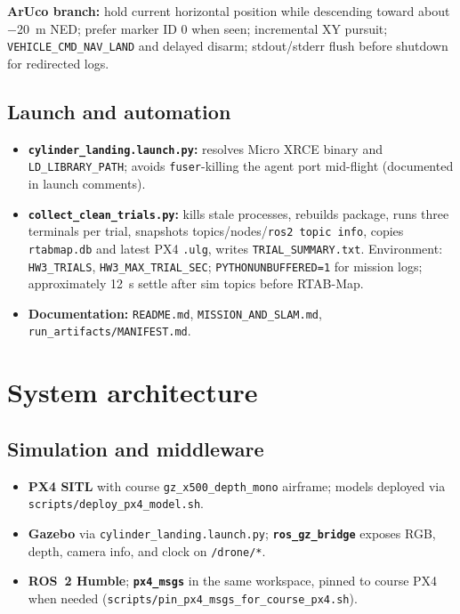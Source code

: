 \documentclass[11pt]{article}
\begin{document}
\textbf{ArUco branch:} hold current horizontal position while descending toward about \SI{-20}{m} NED; prefer marker ID 0 when seen; incremental XY pursuit; \texttt{VEHICLE\_CMD\_NAV\_LAND} and delayed disarm; stdout/stderr flush before shutdown for redirected logs.

\subsection{Launch and automation}
\begin{itemize}[itemsep=2pt]
    \item \textbf{\texttt{cylinder\_landing.launch.py}:} resolves Micro XRCE binary and \texttt{LD\_LIBRARY\_PATH}; avoids \texttt{fuser}-killing the agent port mid-flight (documented in launch comments).
    \item \textbf{\texttt{collect\_clean\_trials.py}:} kills stale processes, rebuilds package, runs three terminals per trial, snapshots topics/nodes/\texttt{ros2 topic info}, copies \texttt{rtabmap.db} and latest PX4 \texttt{.ulg}, writes \texttt{TRIAL\_SUMMARY.txt}. Environment: \texttt{HW3\_TRIALS}, \texttt{HW3\_MAX\_TRIAL\_SEC}; \texttt{PYTHONUNBUFFERED=1} for mission logs; approximately \SI{12}{s} settle after sim topics before RTAB-Map.
    \item \textbf{Documentation:} \texttt{README.md}, \texttt{MISSION\_AND\_SLAM.md}, \texttt{run\_artifacts/MANIFEST.md}.
\end{itemize}

\newpage
\section{System architecture}
\subsection{Simulation and middleware}
\begin{itemize}[itemsep=2pt]
    \item \textbf{PX4 SITL} with course \texttt{gz\_x500\_depth\_mono} airframe; models deployed via \texttt{scripts/deploy\_px4\_model.sh}.
    \item \textbf{Gazebo} via \texttt{cylinder\_landing.launch.py}; \textbf{\texttt{ros\_gz\_bridge}} exposes RGB, depth, camera info, and clock on \texttt{/drone/*}.
    \item \textbf{ROS~2 Humble}; \textbf{\texttt{px4\_msgs}} in the same workspace, pinned to course PX4 when needed (\texttt{scripts/pin\_px4\_msgs\_for\_course\_px4.sh}).
\end{itemize}
\end{document}
